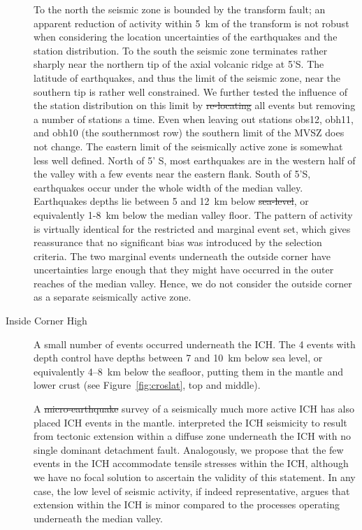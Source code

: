\documentclass[jgrga]{agu2001} %
\newlength{\tw}
\providecommand{\DIFadd}[1]{{\protect\color{blue}\uwave{#1}}} %
\providecommand{\DIFdel}[1]{{\protect\color{red}\sout{#1}}}                      %
\providecommand{\DIFaddbegin}{} %
\providecommand{\DIFaddend}{} %
\providecommand{\DIFdelbegin}{} %
\providecommand{\DIFdelend}{} %
\begin{document}
\begin{article}
\begin{description}
  To the north the seismic zone is
bounded by the transform fault; an apparent reduction of activity
within 5~km of the transform is not robust when considering the
location uncertainties of the earthquakes and the station
distribution. To the south the seismic zone terminates rather sharply near the
northern tip of the axial volcanic ridge at 5'S.  The latitude
of earthquakes, and thus the limit of the seismic zone,
 near the southern tip is rather well constrained.  We
further tested the influence of the station distribution on this limit
by \DIFdelbegin \DIFdel{re-locating }\DIFdelend \DIFaddbegin \DIFadd{relocating }\DIFaddend all events but removing a number of stations a time.
Even when leaving out stations obs12, obh11, and obh10 (the
southernmost row) the southern limit of the MVSZ
does not change.  The eastern limit of the seismically active zone is
somewhat less well defined.  North of 5' S, most earthquakes are
in the western half of the valley with a few events near the eastern
flank.  South of  5'S, earthquakes occur under the whole
width of the median valley. Earthquakes depths lie between 5 and 12~km
below \DIFdelbegin \DIFdel{sea-level}\DIFdelend \DIFaddbegin \DIFadd{sea level}\DIFaddend , or equivalently 1-8~km below the median valley floor.  The pattern
of activity is virtually identical for the restricted and marginal
event set, which gives reassurance that no significant bias was
introduced by the selection criteria.
  The two marginal events
underneath the outside corner have uncertainties large enough that
they might have occurred in the outer reaches of the median valley. Hence, we
do not consider the outside corner as a separate seismically
active zone.

\item[Inside Corner High]  A small number of events occurred
underneath the ICH.  The  4 events with depth control have depths
between 7 and 10~km below sea level, or equivalently 4--8~km
below the seafloor, putting them in the mantle and lower
crust (see Figure~\ref{fig:croslat}, top and middle). 

A \DIFdelbegin \DIFdel{micro-earthquake }\DIFdelend \DIFaddbegin \DIFadd{microearthquake }\DIFaddend survey of a  seismically much more active ICH
\citep[at 29\dg N,][]{wolfe95} has also placed ICH events in the
mantle.
\citet{wolfe95} interpreted the ICH
seismicity to result from tectonic extension within a
diffuse zone underneath the ICH with no single dominant detachment
fault.  Analogously, we propose that the few events in the ICH
accommodate tensile stresses within the ICH, although we have no focal solution to
ascertain the validity of this statement.  In any case, the low level
of seismic activity, if indeed representative, argues that extension
within the ICH is minor compared to the processes operating underneath the
median valley.


\end{description}
\end{article}
\end{document}
